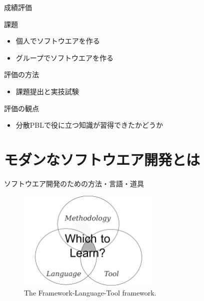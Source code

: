 \documentclass[t, aspectratio=169]{beamer}
\begin{document}
\begin{frame}[label=sec-1-3-2]{成績評価}
\begin{block}{課題}
\begin{itemize}
\item 個人でソフトウエアを作る
\item グループでソフトウエアを作る
\end{itemize}
\end{block}

\begin{block}{評価の方法}
\begin{itemize}
\item 課題提出と実技試験
\end{itemize}
\end{block}

\begin{block}{評価の観点}
\begin{itemize}
\item 分散PBLで役に立つ知識が習得できたかどうか
\end{itemize}
\end{block}
\end{frame}

\section{モダンなソフトウエア開発とは}
\label{sec-1-4}
\begin{frame}[label=sec-1-4-1]{ソフトウエア開発のための方法・言語・道具}
\begin{figure}[htb]
\centering
\includegraphics[width=0.6\textwidth]{./figures/FLT_framework.pdf}
\caption{\label{FLT_framework}The Framework-Language-Tool framework.}
\end{figure}
\end{frame}
\end{document}
